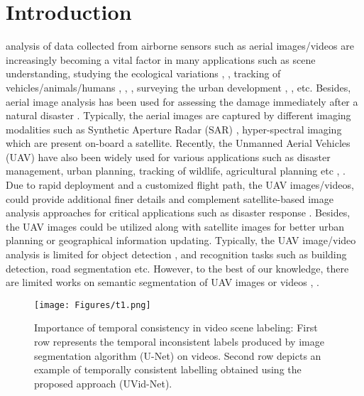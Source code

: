 \documentclass[journal]{IEEEtran}
\begin{document}
\section{Introduction}
 analysis of data collected from airborne sensors such as aerial images/videos are increasingly becoming a vital factor in many applications such as scene understanding, studying the ecological variations  \cite{pai2019automatic}, \cite{River-Ice-Segmentation2020}, \cite{pai2020improved} tracking of vehicles/animals/humans \cite{38},  \cite{40}, \cite{35},  surveying the urban development \cite{42}, \cite{BuildingSegmentation2020}, \cite{RoadSegmentation2020} etc. Besides, aerial image analysis has been used for assessing the damage immediately after a natural disaster \cite{43}. Typically, the aerial images are captured by different imaging modalities such as Synthetic Aperture Radar (SAR) \cite{37}, hyper-spectral imaging \cite{39} which are present on-board a satellite. Recently, the Unmanned Aerial Vehicles (UAV) have also been widely used for various applications such as disaster management, urban planning, tracking of wildlife, agricultural planning etc \cite{bergsma2019operational}, \cite{bulatov2011context}. Due to rapid deployment and a customized flight path, the UAV images/videos, could provide additional finer details and complement satellite-based image analysis approaches for critical applications such as disaster response \cite{luo2019unmanned}. Besides, the UAV images could be utilized along with satellite images for better urban planning or geographical information updating. Typically, the UAV image/video analysis is limited for object detection \cite{fang2011improved}, \cite{7938673} and recognition \cite{wang2012framework} tasks such as building detection, road segmentation etc. However, to the best of our knowledge, there are limited works on semantic segmentation of UAV images or videos \cite{semantic}, \cite{wang2019deep}.
\begin{figure}[tbp]
	\begin{center}
		\texttt{[image: Figures/t1.png]}
	\end{center}
	
	\caption{ Importance of temporal consistency in video scene labeling: First row represents the temporal inconsistent labels produced by image segmentation algorithm (U-Net) on videos. Second row depicts an example of temporally consistent labelling obtained using the proposed approach (UVid-Net).}
	\label{fig:1}
	
\end{figure}
\end{document}
